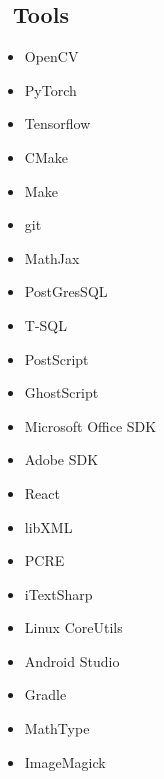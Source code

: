 \documentclass[a3paper]{article}
\begin{document}
\subsection*{\faWrench \ Tools} \vspace{-1em}
\begin{multicols}{4}
\small \begin{itemize}
    \item[\faImage] OpenCV
    \item[\faFire] PyTorch
    \item[\faGoogle] Tensorflow
    \item[\faBuildingO] CMake
    \item[\faBuilding] Make
    \item[\faGitSquare]git
    \item[\faRocket] MathJax
    \item[\faDatabase] PostGresSQL
    \item[\faDatabase] T-SQL
    \item[\faPaperPlaneO] PostScript
    \item[\faPaperPlane] GhostScript
    \item[\faWindows] Microsoft Office SDK
    \item[\faFilePdfO] Adobe SDK
    \item[\faSitemap] React
    \item[\faTh] libXML
    \item[\faRegistered] PCRE
    \item[\faHashtag] iTextSharp
    \item[\faLinux] Linux CoreUtils
    \item[\faAndroid] Android Studio
    \item[\faGlide] Gradle
    \item[\faSubscript] MathType
    \item[\faImage] ImageMagick
\end{itemize}
\end{multicols}

\end{document}
